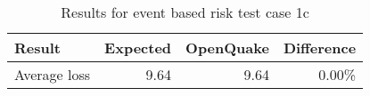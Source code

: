 \begin{table}[htbp]

\centering
\begin{tabular}{ l r r r }

\hline
\rowcolor{anti-flashwhite}
\bf{Result} & \bf{Expected} & \bf{OpenQuake} & \bf{Difference}\\
\hline
Average loss & 9.64 & 9.64 & 0.00\% \\
\hline
\end{tabular}

\caption{Results for event based risk test case 1c}
\label{tab:result-ebr-1c}
\end{table}